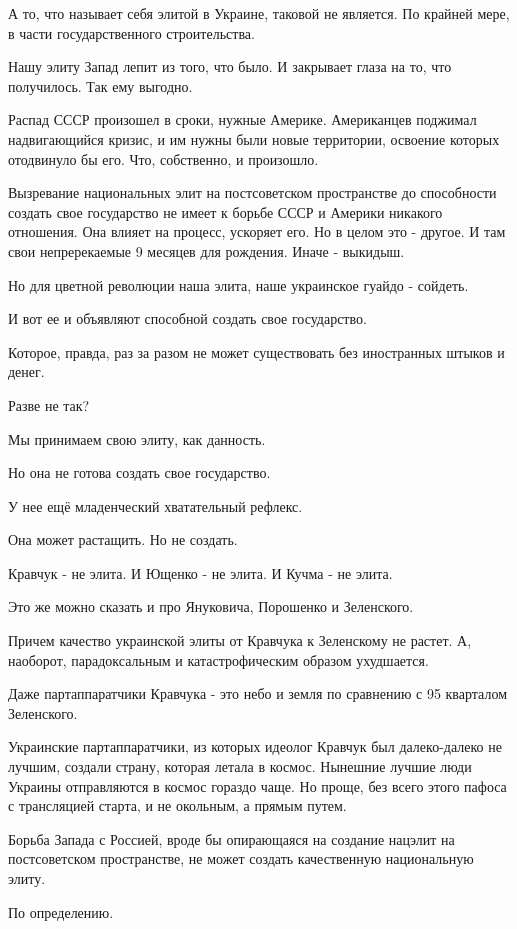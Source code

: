 А то, что называет себя элитой в Украине, таковой не является. По крайней мере,
в части государственного строительства.

Нашу элиту Запад лепит из того, что было. И закрывает глаза на то, что
получилось. Так ему выгодно.

Распад СССР произошел в сроки, нужные Америке. Американцев поджимал
надвигающийся кризис, и им нужны были новые территории, освоение которых
отодвинуло бы его. Что, собственно, и произошло.

Вызревание национальных элит на постсоветском пространстве до способности
создать свое государство не имеет к борьбе СССР и Америки никакого отношения.
Она влияет на процесс, ускоряет его. Но в целом это - другое. И там свои
непререкаемые 9 месяцев для рождения. Иначе - выкидыш.

Но для цветной революции наша элита, наше украинское гуайдо - сойдеть.

И вот ее и объявляют способной создать свое государство.

Которое, правда, раз за разом не может существовать без иностранных штыков и
денег.

Разве не так?

Мы принимаем свою элиту, как данность.

Но она не готова создать свое государство.

У нее ещё младенческий хватательный рефлекс.

Она может растащить. Но не создать.

Кравчук - не элита. И Ющенко - не элита. И Кучма - не элита.

Это же можно сказать и про Януковича, Порошенко и Зеленского.

Причем качество украинской элиты от Кравчука к Зеленскому не растет. А,
наоборот, парадоксальным и катастрофическим образом ухудшается.

Даже партаппаратчики Кравчука - это небо и земля по сравнению с 95 кварталом Зеленского.

Украинские партаппаратчики, из которых идеолог Кравчук был далеко-далеко не
лучшим, создали страну, которая летала в космос. Нынешние лучшие люди Украины
отправляются в космос гораздо чаще. Но проще, без всего этого пафоса с
трансляцией  старта, и не окольным, а прямым путем. 

Борьба Запада с Россией, вроде бы опирающаяся на создание нацэлит на
постсоветском пространстве, не может создать качественную национальную элиту.

По определению.

